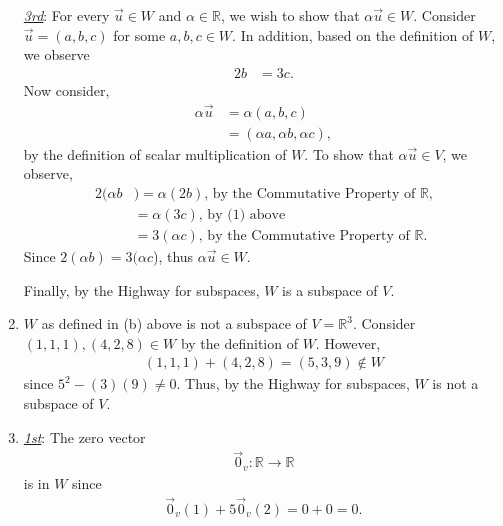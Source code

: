 \documentclass[12pt,answers]{exam}
\begin{document}
\begin{solution}
\begin{enumerate}[label=(\alph*)]
	\underline{\textit{3rd}}: For every $\vec{u} \in W$ and $\alpha\in \mathbb{R}$, we wish to show that $\alpha\vec{u}\in W$. Consider $\vec{u}=(a,b,c)$ for some $a,b,c\in W$. In 			addition, based on the definition of $W$, we observe
	\begin{align}
		2b &= 3c.
	\end{align}
	Now consider,
	\begin{align*}
		\alpha\vec{u} &= \alpha(a,b,c) \\
		&= (\alpha a,\alpha b, \alpha c),
	\end{align*}
	by the definition of scalar multiplication of $W$. To show that $\alpha\vec{u}\in V$, we observe,
	\begin{align*}
		2(\alpha b &)= \alpha (2b) \text{, by the Commutative Property of $\mathbb{R}$,} \\
		&= \alpha (3c) \text{, by (1) above} \\
		&= 3(\alpha c) \text{, by the Commutative Property of $\mathbb{R}$.}
	\end{align*}
	Since $2(\alpha b) = 3(\alpha c$), thus $\alpha\vec{u}\in W$.
	
	Finally, by the Highway for subspaces, $W$ is a subspace of $V$. 
	
\item $W$ as defined in (b) above is not a subspace of $V=\mathbb{R}^{3}$. Consider $(1,1,1),(4,2,8)\in W$ by the definition of $W$. However,
	\begin{align*}
		(1,1,1)+(4,2,8)=(5,3,9)\notin W
	\end{align*}
	since $5^2-(3)(9)\neq0$. Thus, by the Highway for subspaces, $W$ is not a subspace of $V$.
	
\item \underline{\textit{1st}}: The zero vector 
	\begin{align*}
		\vec{0}_{v}: \mathbb{R} \rightarrow \mathbb{R}
	\end{align*}
	is in $W$ since 
	\begin{align*}
		\vec{0}_{v}(1)+5\vec{0}_{v}(2)=0+0=0.
	\end{align*}
	

\end{enumerate}
\end{solution}
\end{document}
